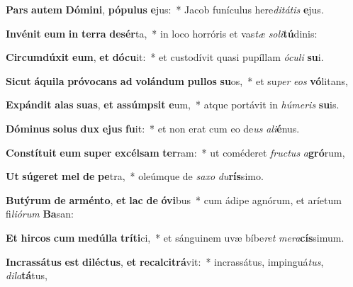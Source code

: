 \item \textbf{Pars} \textbf{au}\textbf{tem} \textbf{Dó}\textbf{mi}\textbf{ni}, \textbf{pó}\textbf{pu}\textbf{lus} \textbf{e}jus:~* Jacob funículus here\textit{di}\textit{tá}\textit{tis} \textbf{e}jus.
\item \textbf{In}\textbf{vé}\textbf{nit} \textbf{e}\textbf{um} \textbf{in} \textbf{ter}\textbf{ra} \textbf{de}\textbf{sér}ta,~* in loco horróris et vas\textit{tæ} \textit{so}\textit{li}\textbf{tú}dinis:
\item \textbf{Cir}\textbf{cum}\textbf{dú}\textbf{xit} \textbf{e}\textbf{um}, \textbf{et} \textbf{dó}\textbf{cu}it:~* et custodívit quasi pupíllam \textit{ó}\textit{cu}\textit{li} \textbf{su}i.
\item \textbf{Sic}\textbf{ut} \textbf{á}\textbf{qui}\textbf{la} \textbf{pró}\textbf{vo}\textbf{cans} \textbf{ad} \textbf{vo}\textbf{lán}\textbf{dum} \textbf{pul}\textbf{los} \textbf{su}os,~* et su\textit{per} \textit{e}\textit{os} \textbf{vó}litans,
\item \textbf{Ex}\textbf{pán}\textbf{dit} \textbf{a}\textbf{las} \textbf{su}\textbf{as}, \textbf{et} \textbf{as}\textbf{súmp}\textbf{sit} \textbf{e}um,~* atque portávit in \textit{hú}\textit{me}\textit{ris} \textbf{su}is.
\item \textbf{Dó}\textbf{mi}\textbf{nus} \textbf{so}\textbf{lus} \textbf{dux} \textbf{e}\textbf{jus} \textbf{fu}it:~* et non erat cum eo de\textit{us} \textit{a}\textit{li}\textbf{é}nus.
\item \textbf{Con}\textbf{stí}\textbf{tu}\textbf{it} \textbf{e}\textbf{um} \textbf{su}\textbf{per} \textbf{ex}\textbf{cél}\textbf{sam} \textbf{ter}ram:~* ut coméderet \textit{fruc}\textit{tus} \textit{a}\textbf{gró}rum,
\item \textbf{Ut} \textbf{sú}\textbf{ge}\textbf{ret} \textbf{mel} \textbf{de} \textbf{pe}tra,~* oleúmque de \textit{sa}\textit{xo} \textit{du}\textbf{rís}simo.
\item \textbf{Bu}\textbf{tý}\textbf{rum} \textbf{de} \textbf{ar}\textbf{mén}\textbf{to}, \textbf{et} \textbf{lac} \textbf{de} \textbf{ó}\textbf{vi}bus~* cum ádipe agnórum, et aríetum fi\textit{li}\textit{ó}\textit{rum} \textbf{Ba}san:
\item \textbf{Et} \textbf{hir}\textbf{cos} \textbf{cum} \textbf{me}\textbf{dúl}\textbf{la} \textbf{trí}\textbf{ti}ci,~* et sánguinem uvæ bíbe\textit{ret} \textit{me}\textit{ra}\textbf{cís}simum.
\item \textbf{In}\textbf{cras}\textbf{sá}\textbf{tus} \textbf{est} \textbf{di}\textbf{léc}\textbf{tus}, \textbf{et} \textbf{re}\textbf{cal}\textbf{ci}\textbf{trá}vit:~* incrassátus, impinguá\textit{tus}, \textit{di}\textit{la}\textbf{tá}tus,
